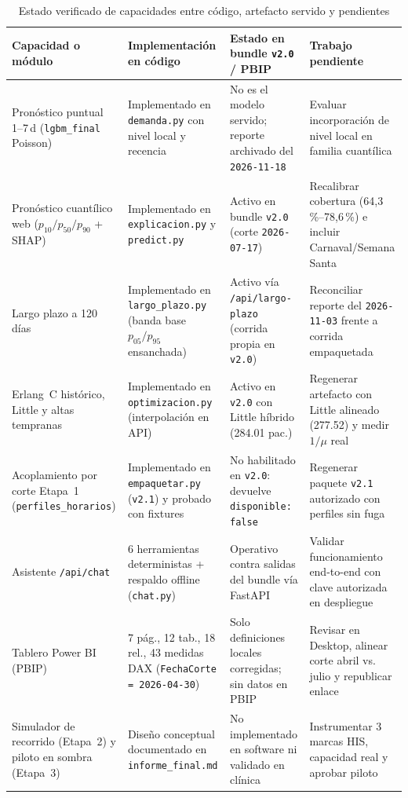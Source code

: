 \begin{table}[htbp]
\caption{Estado verificado de capacidades entre código, artefacto servido y pendientes}
\label{tab:estado_capacidades}
{\singlespacing\small
\begin{tabularx}{\textwidth}{@{}L{0.22\textwidth} L{0.25\textwidth} L{0.24\textwidth} Y@{}}
\toprule
Capacidad o módulo & Implementación en código & Estado en bundle \texttt{v2.0} / PBIP & Trabajo pendiente \\
\midrule
Pronóstico puntual 1--7\,d (\texttt{lgbm\_final} Poisson) & Implementado en \texttt{demanda.py} con nivel local y recencia & No es el modelo servido; reporte archivado del \texttt{2026-11-18} & Evaluar incorporación de nivel local en familia cuantílica \\
Pronóstico cuantílico web ($p_{10}/p_{50}/p_{90}$ + SHAP) & Implementado en \texttt{explicacion.py} y \texttt{predict.py} & Activo en bundle \texttt{v2.0} (corte \texttt{2026-07-17}) & Recalibrar cobertura (64,3\,\%--78,6\,\%) e incluir Carnaval/Semana Santa \\
Largo plazo a 120 días & Implementado en \texttt{largo\_plazo.py} (banda base $p_{05}/p_{95}$ ensanchada) & Activo vía \texttt{/api/largo-plazo} (corrida propia en \texttt{v2.0}) & Reconciliar reporte del \texttt{2026-11-03} frente a corrida empaquetada \\
Erlang~C histórico, Little y altas tempranas & Implementado en \texttt{optimizacion.py} (interpolación en API) & Activo en \texttt{v2.0} con Little híbrido (\num{284,01} pac.) & Regenerar artefacto con Little alineado (\num{277,52}) y medir $1/\mu$ real \\
Acoplamiento por corte Etapa~1 (\texttt{perfiles\_horarios}) & Implementado en \texttt{empaquetar.py} (\texttt{v2.1}) y probado con fixtures & No habilitado en \texttt{v2.0}: devuelve \texttt{disponible: false} & Regenerar paquete \texttt{v2.1} autorizado con perfiles sin fuga \\
Asistente \texttt{/api/chat} & 6 herramientas deterministas + respaldo offline (\texttt{chat.py}) & Operativo contra salidas del bundle vía FastAPI & Validar funcionamiento end-to-end con clave autorizada en despliegue \\
Tablero Power BI (PBIP) & 7 pág., 12 tab., 18 rel., 43 medidas DAX (\texttt{FechaCorte = 2026-04-30}) & Solo definiciones locales corregidas; sin datos en PBIP & Revisar en Desktop, alinear corte abril vs. julio y republicar enlace \\
Simulador de recorrido (Etapa~2) y piloto en sombra (Etapa~3) & Diseño conceptual documentado en \texttt{informe\_final.md} & No implementado en software ni validado en clínica & Instrumentar 3 marcas HIS, capacidad real y aprobar piloto \\
\bottomrule
\end{tabularx}}
\end{table}


